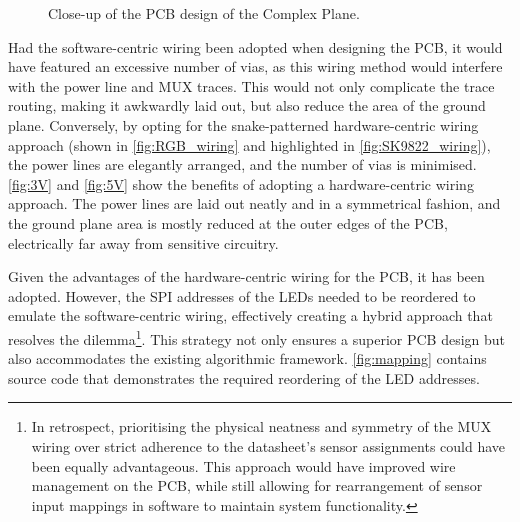 \documentclass[12pt]{article}
\numberwithin{subsubsubsection}{subsubsection}
\begin{document}
\begin{figure}[H]
    \centering
    \caption{Close-up of the PCB design of the Complex Plane.}
    \label{fig:SK9822_wiring}
\end{figure}

Had the software-centric wiring been adopted when designing the PCB, it would have featured an excessive number of vias, as this wiring method would interfere with the power line and MUX traces. This would not only complicate the trace routing, making it awkwardly laid out, but also reduce the area of the ground plane. Conversely, by opting for the snake-patterned hardware-centric wiring approach (shown in \autoref{fig:RGB_wiring} and highlighted in \autoref{fig:SK9822_wiring}), the power lines are elegantly arranged, and the number of vias is minimised. \autoref{fig:3V} and \autoref{fig:5V} show the benefits of adopting a hardware-centric wiring approach. The power lines are laid out neatly and in a symmetrical fashion, and the ground plane area is mostly reduced at the outer edges of the PCB, electrically far away from sensitive circuitry.

Given the advantages of the hardware-centric wiring for the PCB, it has been adopted. However, the SPI addresses of the LEDs needed to be reordered to emulate the software-centric wiring, effectively creating a hybrid approach that resolves the dilemma\footnote{In retrospect, prioritising the physical neatness and symmetry of the MUX wiring over strict adherence to the datasheet’s sensor assignments could have been equally advantageous. This approach would have improved wire management on the PCB, while still allowing for rearrangement of sensor input mappings in software to maintain system functionality.}. This strategy not only ensures a superior PCB design but also accommodates the existing algorithmic framework. \autoref{fig:mapping} contains source code that demonstrates the required reordering of the LED addresses.
\end{document}
